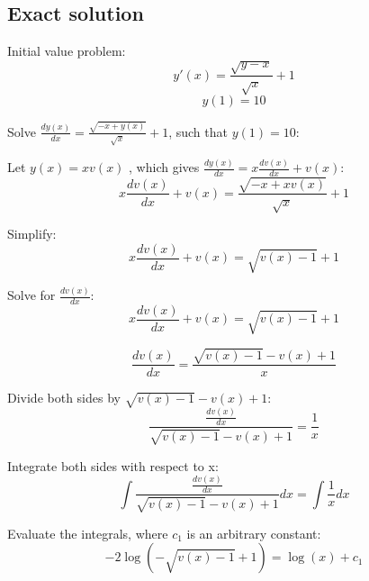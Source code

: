 \documentclass[12pt,letterpaper]{article}
\begin{document}
\begin{center}
    \section*{Exact solution}
\end{center}

Initial value problem:
\begin{equation}
     y'(x) = \frac {\sqrt {y - x}}{\sqrt{x}} + 1
\end{equation}
\begin{equation}
     y(1) = 10
\end{equation}


Solve $ \frac{dy(x)}{ dx} = \frac {\sqrt{-x + y(x)}}{ \sqrt{x}} + 1$, such that $y(1) = 10$:

Let $ y(x) = xv(x)$ , which gives $ \frac{dy(x)}{dx} = x \frac{ dv(x)}{ dx} + v(x)$:
\begin{equation}
     x \frac{ dv(x)}{ dx} + v(x) = \frac{\sqrt{-x + x v(x)}}{\sqrt{x}} + 1
\end{equation}

Simplify:
\begin{equation}
     x \frac{ dv(x)}{ dx} + v(x) = \sqrt{v(x) - 1} + 1
\end{equation}

Solve for $\frac{dv(x)}{dx}$:
\begin{equation}
     x \frac{ dv(x)}{ dx} + v(x) = \sqrt{v(x) - 1} + 1
\end{equation}

\begin{equation}
     \frac{ dv(x)}{ dx} = \frac{ \sqrt{v(x) - 1} - v(x) + 1}{x}
\end{equation}

Divide both sides by $\sqrt{v(x) - 1} - v(x) + 1$:
\begin{equation}
     \frac{\frac{ dv(x)}{ dx}}{\sqrt{v(x) - 1} - v(x) + 1} = \frac{1}{x}
\end{equation}

Integrate both sides with respect to x:
\begin{equation}
    \int {
    \frac{\frac{ dv(x)}{ dx}}{\sqrt{v(x) - 1} - v(x) + 1}
    }dx = \int {\frac{1}{x}}dx
\end{equation}

Evaluate the integrals, where $c_1$ is an arbitrary constant:
\begin{equation}
     -2\log (-\sqrt{v(x) - 1} + 1) = \log (x) + c_1
\end{equation}
\end{document}
